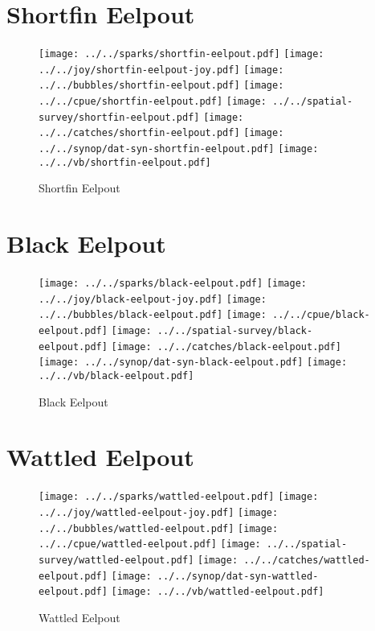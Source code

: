 \section{Shortfin Eelpout}

\begin{figure}[htbp]
\centering
\texttt{[image: ../../sparks/shortfin-eelpout.pdf]}
\texttt{[image: ../../joy/shortfin-eelpout-joy.pdf]}
\texttt{[image: ../../bubbles/shortfin-eelpout.pdf]}
\texttt{[image: ../../cpue/shortfin-eelpout.pdf]}
\texttt{[image: ../../spatial-survey/shortfin-eelpout.pdf]}
\texttt{[image: ../../catches/shortfin-eelpout.pdf]}
\texttt{[image: ../../synop/dat-syn-shortfin-eelpout.pdf]}
\texttt{[image: ../../vb/shortfin-eelpout.pdf]}
\caption{Shortfin Eelpout}
\end{figure}
\clearpage
\section{Black Eelpout}

\begin{figure}[htbp]
\centering
\texttt{[image: ../../sparks/black-eelpout.pdf]}
\texttt{[image: ../../joy/black-eelpout-joy.pdf]}
\texttt{[image: ../../bubbles/black-eelpout.pdf]}
\texttt{[image: ../../cpue/black-eelpout.pdf]}
\texttt{[image: ../../spatial-survey/black-eelpout.pdf]}
\texttt{[image: ../../catches/black-eelpout.pdf]}
\texttt{[image: ../../synop/dat-syn-black-eelpout.pdf]}
\texttt{[image: ../../vb/black-eelpout.pdf]}
\caption{Black Eelpout}
\end{figure}
\clearpage
\section{Wattled Eelpout}

\begin{figure}[htbp]
\centering
\texttt{[image: ../../sparks/wattled-eelpout.pdf]}
\texttt{[image: ../../joy/wattled-eelpout-joy.pdf]}
\texttt{[image: ../../bubbles/wattled-eelpout.pdf]}
\texttt{[image: ../../cpue/wattled-eelpout.pdf]}
\texttt{[image: ../../spatial-survey/wattled-eelpout.pdf]}
\texttt{[image: ../../catches/wattled-eelpout.pdf]}
\texttt{[image: ../../synop/dat-syn-wattled-eelpout.pdf]}
\texttt{[image: ../../vb/wattled-eelpout.pdf]}
\caption{Wattled Eelpout}
\end{figure}
\clearpage
